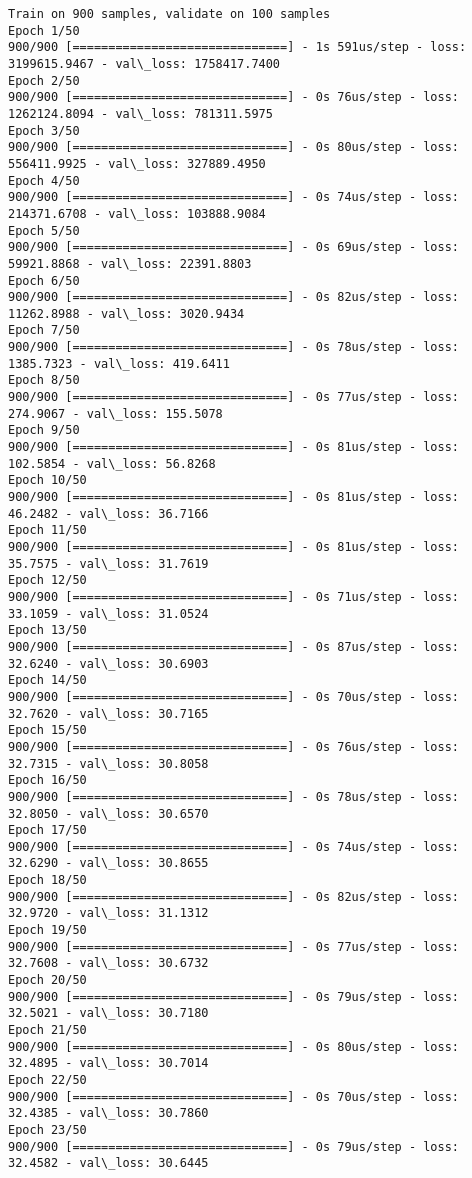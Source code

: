 \documentclass[11pt]{article}
\begin{document}
    \begin{Verbatim}[commandchars=\\\{\}]
Train on 900 samples, validate on 100 samples
Epoch 1/50
900/900 [==============================] - 1s 591us/step - loss: 3199615.9467 - val\_loss: 1758417.7400
Epoch 2/50
900/900 [==============================] - 0s 76us/step - loss: 1262124.8094 - val\_loss: 781311.5975
Epoch 3/50
900/900 [==============================] - 0s 80us/step - loss: 556411.9925 - val\_loss: 327889.4950
Epoch 4/50
900/900 [==============================] - 0s 74us/step - loss: 214371.6708 - val\_loss: 103888.9084
Epoch 5/50
900/900 [==============================] - 0s 69us/step - loss: 59921.8868 - val\_loss: 22391.8803
Epoch 6/50
900/900 [==============================] - 0s 82us/step - loss: 11262.8988 - val\_loss: 3020.9434
Epoch 7/50
900/900 [==============================] - 0s 78us/step - loss: 1385.7323 - val\_loss: 419.6411
Epoch 8/50
900/900 [==============================] - 0s 77us/step - loss: 274.9067 - val\_loss: 155.5078
Epoch 9/50
900/900 [==============================] - 0s 81us/step - loss: 102.5854 - val\_loss: 56.8268
Epoch 10/50
900/900 [==============================] - 0s 81us/step - loss: 46.2482 - val\_loss: 36.7166
Epoch 11/50
900/900 [==============================] - 0s 81us/step - loss: 35.7575 - val\_loss: 31.7619
Epoch 12/50
900/900 [==============================] - 0s 71us/step - loss: 33.1059 - val\_loss: 31.0524
Epoch 13/50
900/900 [==============================] - 0s 87us/step - loss: 32.6240 - val\_loss: 30.6903
Epoch 14/50
900/900 [==============================] - 0s 70us/step - loss: 32.7620 - val\_loss: 30.7165
Epoch 15/50
900/900 [==============================] - 0s 76us/step - loss: 32.7315 - val\_loss: 30.8058
Epoch 16/50
900/900 [==============================] - 0s 78us/step - loss: 32.8050 - val\_loss: 30.6570
Epoch 17/50
900/900 [==============================] - 0s 74us/step - loss: 32.6290 - val\_loss: 30.8655
Epoch 18/50
900/900 [==============================] - 0s 82us/step - loss: 32.9720 - val\_loss: 31.1312
Epoch 19/50
900/900 [==============================] - 0s 77us/step - loss: 32.7608 - val\_loss: 30.6732
Epoch 20/50
900/900 [==============================] - 0s 79us/step - loss: 32.5021 - val\_loss: 30.7180
Epoch 21/50
900/900 [==============================] - 0s 80us/step - loss: 32.4895 - val\_loss: 30.7014
Epoch 22/50
900/900 [==============================] - 0s 70us/step - loss: 32.4385 - val\_loss: 30.7860
Epoch 23/50
900/900 [==============================] - 0s 79us/step - loss: 32.4582 - val\_loss: 30.6445

\end{Verbatim}
\end{document}
